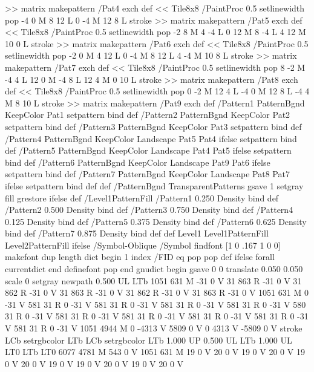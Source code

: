 {{{>> matrix makepattern
/Pat4 exch def
<< Tile8x8
 /PaintProc {0.5 setlinewidth pop -4 0 M 8 12 L
	0 -4 M 12 8 L stroke}
>> matrix makepattern
/Pat5 exch def
<< Tile8x8
 /PaintProc {0.5 setlinewidth pop -2 8 M 4 -4 L
	0 12 M 8 -4 L 4 12 M 10 0 L stroke}
>> matrix makepattern
/Pat6 exch def
<< Tile8x8
 /PaintProc {0.5 setlinewidth pop -2 0 M 4 12 L
	0 -4 M 8 12 L 4 -4 M 10 8 L stroke}
>> matrix makepattern
/Pat7 exch def
<< Tile8x8
 /PaintProc {0.5 setlinewidth pop 8 -2 M -4 4 L
	12 0 M -4 8 L 12 4 M 0 10 L stroke}
>> matrix makepattern
/Pat8 exch def
<< Tile8x8
 /PaintProc {0.5 setlinewidth pop 0 -2 M 12 4 L
	-4 0 M 12 8 L -4 4 M 8 10 L stroke}
>> matrix makepattern
/Pat9 exch def
/Pattern1 {PatternBgnd KeepColor Pat1 setpattern} bind def
/Pattern2 {PatternBgnd KeepColor Pat2 setpattern} bind def
/Pattern3 {PatternBgnd KeepColor Pat3 setpattern} bind def
/Pattern4 {PatternBgnd KeepColor Landscape {Pat5} {Pat4} ifelse setpattern} bind def
/Pattern5 {PatternBgnd KeepColor Landscape {Pat4} {Pat5} ifelse setpattern} bind def
/Pattern6 {PatternBgnd KeepColor Landscape {Pat9} {Pat6} ifelse setpattern} bind def
/Pattern7 {PatternBgnd KeepColor Landscape {Pat8} {Pat7} ifelse setpattern} bind def
} def
%
%
%
/PatternBgnd {
  TransparentPatterns {} {gsave 1 setgray fill grestore} ifelse
} def
%
%
/Level1PatternFill {
/Pattern1 {0.250 Density} bind def
/Pattern2 {0.500 Density} bind def
/Pattern3 {0.750 Density} bind def
/Pattern4 {0.125 Density} bind def
/Pattern5 {0.375 Density} bind def
/Pattern6 {0.625 Density} bind def
/Pattern7 {0.875 Density} bind def
} def
%
%
Level1 {Level1PatternFill} {Level2PatternFill} ifelse
%
/Symbol-Oblique /Symbol findfont [1 0 .167 1 0 0] makefont
dup length dict begin {1 index /FID eq {pop pop} {def} ifelse} forall
currentdict end definefont pop
end
gnudict begin
gsave
0 0 translate
0.050 0.050 scale
0 setgray
newpath
0.500 UL
LTb
1051 631 M
-31 0 V
31 863 R
-31 0 V
31 862 R
-31 0 V
31 863 R
-31 0 V
31 862 R
-31 0 V
31 863 R
-31 0 V
1051 631 M
0 -31 V
581 31 R
0 -31 V
581 31 R
0 -31 V
581 31 R
0 -31 V
581 31 R
0 -31 V
580 31 R
0 -31 V
581 31 R
0 -31 V
581 31 R
0 -31 V
581 31 R
0 -31 V
581 31 R
0 -31 V
581 31 R
0 -31 V
1051 4944 M
0 -4313 V
5809 0 V
0 4313 V
-5809 0 V
stroke
LCb setrgbcolor
LTb
LCb setrgbcolor
LTb
1.000 UP
0.500 UL
LTb
1.000 UL
LT0
LTb
LT0
6077 4781 M
543 0 V
1051 631 M
19 0 V
20 0 V
19 0 V
20 0 V
19 0 V
20 0 V
19 0 V
19 0 V
20 0 V
19 0 V
20 0 V
}}
